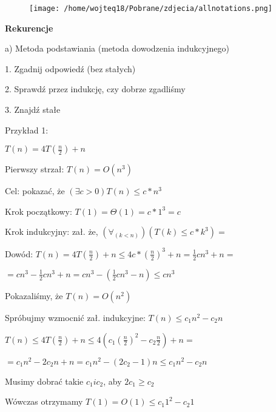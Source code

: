 \documentclass{article}
\begin{document}
\vspace{1\baselineskip}
\begin{figure}[H]
    \centering
    \texttt{[image: /home/wojteq18/Pobrane/zdjecia/allnotations.png]}
    \label{fig:example_image}
\end{figure}
\vspace{1\baselineskip}
\textbf{Rekurencje} \par
\vspace{1\baselineskip}
a) Metoda podstawiania (metoda dowodzenia indukcyjnego) \par
    \hspace{20pt}1. Zgadnij odpowiedź (bez stałych) \par
    \hspace{20pt}2. Sprawdź przez indukcję, czy dobrze zgadliśmy \par
    \hspace{20pt}3. Znajdź stałe \par
\vspace{1\baselineskip}
Przykład 1: \par
\vspace{1\baselineskip}
$T(n) = 4T(\frac{n}{2}) + n$   \par
Pierwszy strzał: $T(n) = O(n^3)$ \par
Cel: pokazać, że $(\exists c > 0) T(n) \leq c * n^3$ \par
Krok początkowy: $T(1) = \Theta (1) = c * 1^3 = c$ \par
Krok indukcyjny: zał. że, $(\forall_(k < n)) (T(k) \leq c * k^3) = $ \par
Dowód: $T(n) = 4T(\frac{n}{2}) + n \leq 4c * (\frac{n}{2})^3 + n = \frac{1}{2}cn^3 + n =$ \par
$= cn^3 - \frac{1}{2}cn^3 + n = cn^3 - (\frac{1}{2}cn^3 - n) \leq cn^3$ \par
Pokazaliśmy, że $T(n) = O(n^2)$ \par
\vspace{1\baselineskip}
Spróbujmy wzmocnić zał. indukcyjne: $T(n) \leq c_1 n^2 - c_2 n$ \par
$T(n) \leq 4T(\frac{n}{2}) + n \leq 4(c_1 (\frac{n}{2})^2 - c_2 \frac{n}{2}) + n = $ \par
$ = c_1 n^2 - 2c_2 n + n = c_1 n^2 - (2c_2 - 1)n \leq c_1 n^2 - c_2 n$ \par
Musimy dobrać takie $c_1 i c _2$, aby $2c_1 \geq c_2$ \par
Wówczas otrzymamy $T(1) = O(1) \leq c_1 1^2 - c_2 1$ \par
\end{document}
